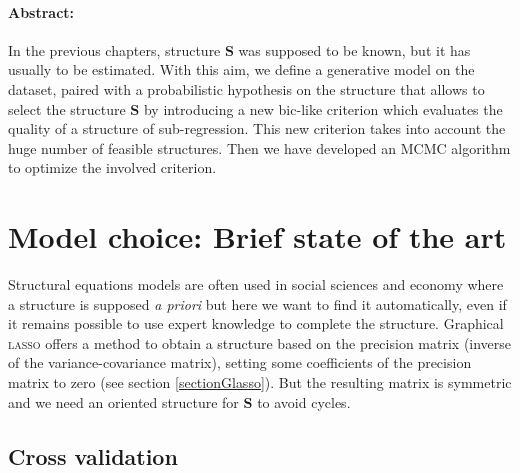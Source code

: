 \documentclass[12pt,a4paper]{report}
\begin{document}
\paragraph{Abstract:} In the previous chapters, structure $\boldsymbol{S}$ was supposed to be known, but it has usually to be estimated. With this aim, we define a generative model on the dataset, paired with a probabilistic hypothesis on the structure that allows to select the structure $\boldsymbol{S}$ by introducing
a new {\sc bic}-like criterion which evaluates the quality of a structure of sub-regression. This new criterion takes into account the huge number of feasible structures. Then we have developed an MCMC algorithm to optimize the involved criterion.%
\section{Model choice: Brief state of the art}
		Structural equations models are often used in social sciences and economy where a structure is supposed {\it a priori} but here we want to find it automatically, even if it remains possible to use expert knowledge to complete the structure. Graphical \textsc{lasso} offers a method \cite{friedman2008sparse} to obtain a structure based on the precision matrix (inverse of the variance-covariance matrix), setting some coefficients of the precision matrix to zero (see section \ref{sectionGlasso}). But the resulting matrix is symmetric and we need an oriented structure for $\boldsymbol{S}$ to avoid cycles.
			\subsection{Cross validation}
				
\end{document}

